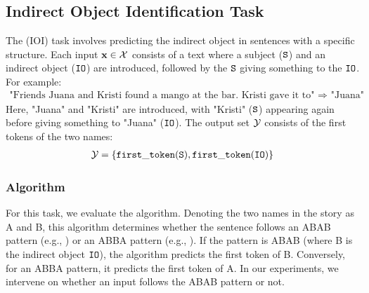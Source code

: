\subsection{Indirect Object Identification Task}\label{app:ioi_task}

\begin{task}\label{task:Indirect_object_identification}
    The  (IOI) task involves predicting the indirect object in sentences with a specific structure. Each input $\mathbf{x}\in\mathcal{X}$ consists of a text where a subject ($\mathtt{S}$) and an indirect object ($\mathtt{IO}$) are introduced, followed by the $\mathtt{S}$ giving something to the $\mathtt{IO}$. For example:
    \begin{align}
        \text{"Friends Juana and Kristi found a mango at the bar. Kristi gave it to" $\Rightarrow$ "Juana"} \nonumber
    \end{align}
    Here, "Juana" and "Kristi" are introduced, with "Kristi" ($\mathtt{S}$) appearing again before giving something to "Juana" ($\mathtt{IO}$).
    The output set $\mathcal{Y}$ consists of the first tokens of the two names:
    \begin{align}
        \mathcal{Y}=\{\mathtt{first\_token}(\mathtt{S}),\mathtt{first\_token}(\mathtt{IO})\}
    \end{align}
\end{task}
\subsubsection{Algorithm}\label{app:ioi_algorithms}

For this task, we evaluate the  algorithm. Denoting the two names in the story as A and B, this algorithm determines whether the sentence follows an ABAB pattern (e.g., ) or an ABBA pattern (e.g., ). If the pattern is ABAB (where B is the indirect object $\mathtt{IO}$), the algorithm predicts the first token of B. Conversely, for an ABBA pattern, it predicts the first token of A. In our experiments, we intervene on whether an input follows the ABAB pattern or not.

